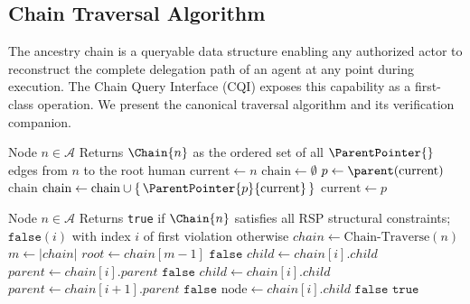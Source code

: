 \subsection{Chain Traversal Algorithm}
\label{sec:chain_traversal_algorithm}

The ancestry chain is a queryable data structure enabling any authorized actor to reconstruct the complete delegation path of an agent at any point during execution. The Chain Query Interface (CQI) exposes this capability as a first-class operation. We present the canonical traversal algorithm and its verification companion.

\begin{algorithm}[htbp]
\caption{Chain-Traverse($n$)}
\label{alg:chain_traverse}
\begin{algorithmic}[1]
\Require Node $n \in \mathcal{A}$
\Ensure Returns $\Chain{n}$ as the ordered set of all $\ParentPointer{}$ edges from $n$ to the root human
\State $\text{current} \gets n$
\State $\text{chain} \gets \emptyset$
\Loop
    \State $p \gets \parent(\text{current})$
        \State \Return $\text{chain}$ 
    \EndIf
    \State $\text{chain} \gets \text{chain} \cup \{\,\ParentPointer{p}{\text{current}}\,\}$
    \State $\text{current} \gets p$
\EndLoop
\end{algorithmic}
\end{algorithm}

\begin{algorithm}[htbp]
\caption{Chain-Verify($n$)}
\label{alg:chain_verify}
\begin{algorithmic}[1]
\Require Node $n \in \mathcal{A}$
\Ensure Returns \texttt{true} if $\Chain{n}$ satisfies all RSP structural constraints; $\texttt{false}(i)$ with index $i$ of first violation otherwise
\State $chain \gets \text{Chain-Traverse}(n)$
\State $m \gets |chain|$
\Statex
{}
\State $root \gets chain[m-1]$
    \State \Return $\texttt{false}$ 
\EndIf
\Statex
{}
    \State $child \leftarrow chain[i].child$
    \State $parent \leftarrow chain[i].parent$
        \State \Return $\texttt{false}$ 
    \EndIf
\EndFor
\Statex
{}
    \State $child \leftarrow chain[i].child$
    \State $parent \leftarrow chain[i+1].parent$
        \State \Return $\texttt{false}$ 
    \EndIf
\EndFor
\Statex
{}
    \State $\text{node} \gets chain[i].child$
        \State \Return $\texttt{false}$ 
    \EndIf
\EndFor
\State \Return $\texttt{true}$
\end{algorithmic}
\end{algorithm}

